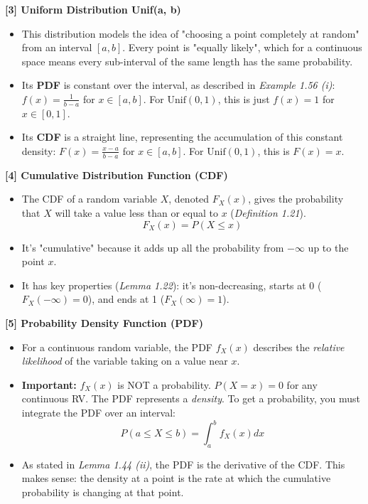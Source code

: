 \documentclass[11pt,a4paper]{article}
\begin{document}
\begin{tcolorbox}[colback=orange!5!white,colframe=orange!75!black,title=In-depth Concepts]
\hypertarget{concept:unif}{\textbf{[3] Uniform Distribution Unif(a, b)}}
\begin{itemize}
    \item This distribution models the idea of "choosing a point completely at random" from an interval $[a, b]$. Every point is "equally likely", which for a continuous space means every sub-interval of the same length has the same probability.
    \item Its \textbf{PDF} is constant over the interval, as described in \textit{Example 1.56 (i)}: $f(x) = \frac{1}{b-a}$ for $x \in [a, b]$. For $\text{Unif}(0,1)$, this is just $f(x) = 1$ for $x \in [0, 1]$.
    \item Its \textbf{CDF} is a straight line, representing the accumulation of this constant density: $F(x) = \frac{x-a}{b-a}$ for $x \in [a, b]$. For $\text{Unif}(0,1)$, this is $F(x) = x$.
\end{itemize}
\end{tcolorbox}

\begin{tcolorbox}[colback=purple!5!white,colframe=purple!75!black,title=In-depth Concepts]
\hypertarget{concept:cdf}{\textbf{[4] Cumulative Distribution Function (CDF)}}
\begin{itemize}
    \item The CDF of a random variable $X$, denoted $F_X(x)$, gives the probability that $X$ will take a value less than or equal to $x$ (\textit{Definition 1.21}).
    \[ F_X(x) = P(X \leq x) \]
    \item It's "cumulative" because it adds up all the probability from $-\infty$ up to the point $x$.
    \item It has key properties (\textit{Lemma 1.22}): it's non-decreasing, starts at 0 ($F_X(-\infty) = 0$), and ends at 1 ($F_X(\infty) = 1$).
\end{itemize}
\end{tcolorbox}

\begin{tcolorbox}[colback=red!5!white,colframe=red!75!black,title=In-depth Concepts]
\hypertarget{concept:pdf}{\textbf{[5] Probability Density Function (PDF)}}
\begin{itemize}
    \item For a continuous random variable, the PDF $f_X(x)$ describes the \textit{relative likelihood} of the variable taking on a value near $x$.
    \item \textbf{Important:} $f_X(x)$ is NOT a probability. $P(X=x)=0$ for any continuous RV. The PDF represents a \textit{density}. To get a probability, you must integrate the PDF over an interval:
    \[ P(a \leq X \leq b) = \int_a^b f_X(x) dx \]
    \item As stated in \textit{Lemma 1.44 (ii)}, the PDF is the derivative of the CDF. This makes sense: the density at a point is the rate at which the cumulative probability is changing at that point.
\end{itemize}
\end{tcolorbox}
\end{document}
